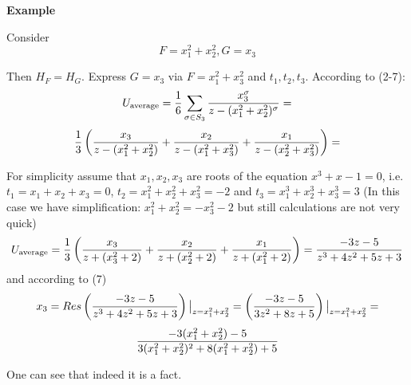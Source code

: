 \medskip

{\bf Example}

Consider
                   $$
                   F=x_1^2+x_2^2, G=x_3
                   $$

 Then $H_F=H_G$. Express $G=x_3$ via $F=x_1^2+x_3^2$ and $t_1,t_2,t_3$. According to (2-7):
                   $$
    U_{\rm average}={1\over 6}\sum_{\sigma\in S_3}
            {x_3^\sigma\over z-(x_1^2+x_2^2)^\sigma}=
            $$
               $$
 {1\over 3}\left({x_3\over z-(x_1^2+x_2^2)}+
 {x_2\over z-(x_1^2+x_3^2)}+{x_1\over z-(x_2^2+x_3^2)}\right)=
               $$

For simplicity assume that $x_1,x_2,x_3$ are roots of the equation
$x^3+x-1=0$, i.e. $t_1=x_1+x_2+x_3=0$, $t_2=x_1^2+x_2^2+x_3^2=-2$
and $t_3=x_1^3+x_2^3+x_3^3=3$
(In this case we have simplification:
$x_1^2+x_2^2=-x_3^2-2$ but still calculations are not very quick)
                 $$
            U_{\rm average}={1\over 3}
   \left({x_3\over z+(x_3^2+2)}+
 {x_2\over z+(x_2^2+2)}+{x_1\over z+(x_1^2+2)}\right)=
   {-3z-5\over z^3+4z^2+5z+3}
               $$
and according to (7)
             $$
    x_3=Res \left({-3z-5\over z^3+4z^2+5z+3}\right)\big\vert_{z=x_1^2+x^2_2}=
             \left({-3z-5\over 3z^2+8z+5}\right)\big\vert_{z=x_1^2+x^2_2}=
              $$
              $$
           {-3(x_1^2+x_2^2)-5\over 3(x_1^2+x_2^2)^2+8(x_1^2+x_2^2)+5}
              $$

One can see that indeed it is a fact.

  \bye

